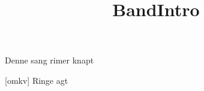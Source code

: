 \documentclass[a4paper,11pt]{article}
\title{BandIntro\texttrademark}
\begin{document}
\maketitle

\begin{song}
   Denne sang rimer knapt

  [omkv] Ringe agt

\end{song}
\end{document}

